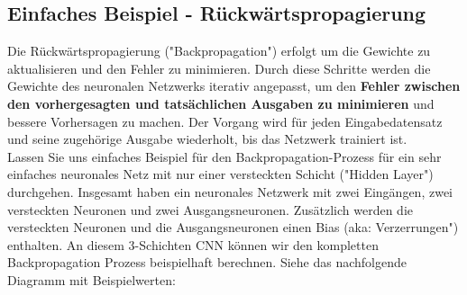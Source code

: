\documentclass[12pt]{article}
\begin{document}
\subsection{Einfaches Beispiel - Rückwärtspropagierung}
%
Die Rückwärtspropagierung ("Backpropagation") erfolgt um die Gewichte zu aktualisieren und den Fehler zu minimieren. Durch diese Schritte werden die Gewichte des neuronalen Netzwerks iterativ angepasst, um den \textbf{Fehler zwischen den vorhergesagten und tatsächlichen Ausgaben zu minimieren} und bessere Vorhersagen zu machen. Der Vorgang wird für jeden Eingabedatensatz und seine zugehörige Ausgabe wiederholt, bis das Netzwerk trainiert ist.
\\Lassen Sie uns einfaches Beispiel für den Backpropagation-Prozess für ein sehr einfaches neuronales Netz mit nur einer versteckten Schicht ("Hidden Layer") durchgehen. Insgesamt haben ein neuronales Netzwerk mit zwei Eingängen, zwei versteckten Neuronen und zwei Ausgangsneuronen. Zusätzlich werden die versteckten Neuronen und die Ausgangsneuronen einen Bias (aka: Verzerrungen") enthalten. An diesem 3-Schichten CNN können wir den kompletten Backpropagation Prozess beispielhaft berechnen. Siehe das nachfolgende Diagramm mit Beispielwerten:\\

\end{document}
